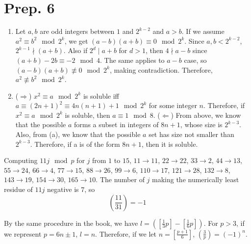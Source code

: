 \documentclass[12pt]{article}
\newenvironment{problem}[2][Problem]{\begin{trivlist}
\item[\hskip \labelsep {\bfseries #1}\hskip \labelsep {\bfseries #2.}]}{\end{trivlist}}
\begin{document}




\section{Prep. 6}
\begin{problem}{1}
\end{problem}
\begin{enumerate}
    \item [(a)] Let $a,b$ are odd integers between $1$ and $2^{k-2}$ and $a>b$. If we assume $a^2\equiv b^2\mod 2^{k}$, we get $(a-b)(a+b)\equiv 0\mod 2^k$. Since $a,b<2^{k-2}$, $2^{k-1}\nmid (a+b)$. Also if $2^d\mid a+b$ for $d>1$, then $4\nmid a-b$ since $(a+b)-2b \equiv -2\mod 4$. The same applies to $a-b$ case, so $(a-b)(a+b)\not\equiv 0\mod 2^k$, making contradiction. Therefore, $a^2\not\equiv b^2\mod 2^k$.
    \item[(b)] ($\Rightarrow$) $x^2\equiv a\mod 2^k$ is soluble iff $a\equiv (2n+1)^2\equiv 4n(n+1)+1\mod 2^k$ for some integer $n$. Therefore, if $x^2\equiv a\mod 2^k$ is soluble, then $a\equiv 1\mod 8$.
    ($\Leftarrow$) From above, we know that the possible $a$ forms a subset in integers of $8n+1$, whose size is $2^{k-3}$. Also, from (a), we know that the possible $a$ set has size not smaller than $2^{k-3}$. Therefore, if a is of the form $8n+1$, then it is soluble.
\end{enumerate}
\begin{problem}{2}
\end{problem}
Computing $11j\mod p$ for $j$ from $1$ to $15$, $11\rightarrow 11$, $22\rightarrow22$, $33\rightarrow2$, $44\rightarrow13$, $55\rightarrow24$, $66\rightarrow4$, $77\rightarrow15$, $88\rightarrow26$, $99\rightarrow 6$, $110\rightarrow 17$, $121\rightarrow28$, $132\rightarrow8$, $143\rightarrow19$, $154\rightarrow 30$, $165\rightarrow10$. The number of $j$ making the numerically least residue of $11j$ negative is $7$, so
\begin{equation*}
    \left(\frac{11}{31}\right)=-1
\end{equation*}
\begin{problem}{3}
By the same procedure in the book, we have $l=([\frac{1}{3}p]-[\frac{1}{6}p])$. For $p>3$, if we represent $p=6n\pm 1$, $l=n$. Therefore, if we let $n=[\frac{p+1}{6}]$, $\left(\frac{3}{p}\right)=(-1)^n$.
\end{problem}
\end{document}
